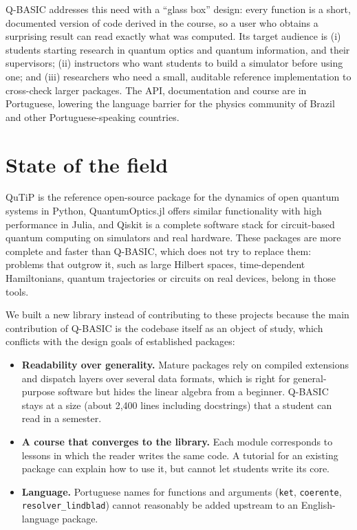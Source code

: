 \documentclass[
]{article}
\providecommand{\tightlist}{%
  \setlength{\itemsep}{0pt}\setlength{\parskip}{0pt}}
\begin{document}
Q-BASIC addresses this need with a ``glass box'' design: every function
is a short, documented version of code derived in the course, so a user
who obtains a surprising result can read exactly what was computed. Its
target audience is (i) students starting research in quantum optics and
quantum information, and their supervisors; (ii) instructors who want
students to build a simulator before using one; and (iii) researchers
who need a small, auditable reference implementation to cross-check
larger packages. The API, documentation and course are in Portuguese,
lowering the language barrier for the physics community of Brazil and
other Portuguese-speaking countries.

\section{State of the field}\label{state-of-the-field}

QuTiP \citep{johansson2012qutip, johansson2013qutip2} is the reference
open-source package for the dynamics of open quantum systems in Python,
QuantumOptics.jl \citep{kramer2018quantumoptics} offers similar
functionality with high performance in Julia, and Qiskit
\citep{javadi2024qiskit} is a complete software stack for circuit-based
quantum computing on simulators and real hardware. These packages are
more complete and faster than Q-BASIC, which does not try to replace
them: problems that outgrow it, such as large Hilbert spaces,
time-dependent Hamiltonians, quantum trajectories or circuits on real
devices, belong in those tools.

We built a new library instead of contributing to these projects because
the main contribution of Q-BASIC is the codebase itself as an object of
study, which conflicts with the design goals of established packages:

\begin{itemize}
\tightlist
\item
  \textbf{Readability over generality.} Mature packages rely on compiled
  extensions and dispatch layers over several data formats, which is
  right for general-purpose software but hides the linear algebra from a
  beginner. Q-BASIC stays at a size (about 2,400 lines including
  docstrings) that a student can read in a semester.
\item
  \textbf{A course that converges to the library.} Each module
  corresponds to lessons in which the reader writes the same code. A
  tutorial for an existing package can explain how to use it, but cannot
  let students write its core.
\item
  \textbf{Language.} Portuguese names for functions and arguments
  (\texttt{ket}, \texttt{coerente}, \texttt{resolver\_lindblad}) cannot
  reasonably be added upstream to an English-language package.
\end{itemize}
\end{document}
